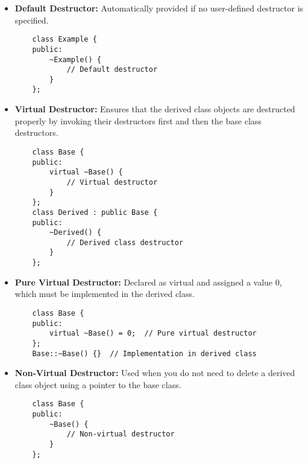 \begin{itemize}
\begin{itemize}
    \item \textbf{Default Destructor:} Automatically provided if no user-defined destructor is specified.
    \begin{tcolorbox}[title=Default Destructor]
    \begin{verbatim}
    class Example {
    public:
        ~Example() {
            // Default destructor
        }
    };
    \end{verbatim}
    \end{tcolorbox}
    
    \item \textbf{Virtual Destructor:} Ensures that the derived class objects are destructed properly by invoking their destructors first and then the base class destructors.
    \begin{tcolorbox}[title=Virtual Destructor] 
    \begin{verbatim}
    class Base {
    public:
        virtual ~Base() {
            // Virtual destructor
        }
    };
    class Derived : public Base {
    public:
        ~Derived() {
            // Derived class destructor
        }
    };
    \end{verbatim}
    \end{tcolorbox}
     
    \item \textbf{Pure Virtual Destructor:} Declared as virtual and assigned a value 0, which must be implemented in the derived class.
    \begin{tcolorbox}[title=Pure Virtual Destructor]
    \begin{verbatim}
    class Base {
    public:
        virtual ~Base() = 0;  // Pure virtual destructor
    };
    Base::~Base() {}  // Implementation in derived class
    \end{verbatim}
    \end{tcolorbox}
    
    \item \textbf{Non-Virtual Destructor:} Used when you do not need to delete a derived class object using a pointer to the base class.
    \begin{tcolorbox}[title=Non-Virtual Destructor]
    \begin{verbatim}
    class Base {
    public:
        ~Base() {
            // Non-virtual destructor
        }
    };
    \end{verbatim}
    \end{tcolorbox}
\end{itemize}    
\end{itemize}

